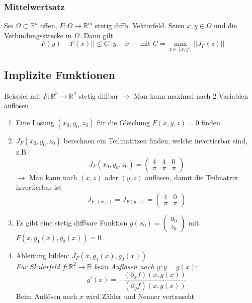 \begin{sectionbox}
    \subsubsection{Mittelwertsatz}
    Sei $\Omega \subset \mathbb R^n$ offen, $F: \Omega \rightarrow \mathbb R^m$ stetig diffb. Vektorfeld. 
    Seien $x,y \in \Omega$ und die Verbindungsstrecke in $\Omega$. Dann gilt
    \begin{equation*}
        ||F(y)-F(x)|| \le C||y-x|| \quad \text{mit } C=\max_{z \in [x,y]}{||J_F(z)||}
    \end{equation*}
\end{sectionbox}

\subsection{Implizite Funktionen}
Beispiel mit $F:\mathbb R^3 \rightarrow \mathbb R^2$ stetig diffbar $\rightarrow$ Man kann maximal nach $2$ Variablen auflösen
\begin{enumerate}
    \item Eine Lösung $(x_0,y_0,z_0)$ für die Gleichung $F(x,y,z)=0$ finden
    \item $J_F(x_0,y_0,z_0)$ berechnen ein Teilmatrizen finden, welche invertierbar sind, z.B.:
    \begin{equation*}
    J_F(x_0,y_0,z_0)=\begin{pmatrix}
        4 & 4 & 0 \\ \pi & \pi & \pi
    \end{pmatrix}
    \end{equation*}
    $\rightarrow$ Man kann nach $(x,z)$ oder $(y,z)$ auflösen, damit die Teilmatrix invertierbar ist
    \begin{equation*}
        J_{F,(x,z)}=J_{F(y,z)}=\begin{pmatrix}
            4 & 0 \\ \pi & \pi
        \end{pmatrix}
    \end{equation*}
    \item Es gibt eine stetig diffbare Funktion $g(x_0)=\begin{pmatrix}y_0 \\ z_0\end{pmatrix}$ mit $F(x,g_1(x),g_2(x))=0$
    \item Ableitung bilden: $J_F(x, g_1(x), g_2(x))$ \\
    \textit{Für Skalarfeld $f: \mathbb R^2 \rightarrow \mathbb R$ beim Auflösen nach $y: y=g(x)$}:
    \begin{equation*}
        g'(x)=-\frac{(\partial_xf)(x, g(x))}{(\partial_yf)(x, g(x))}
    \end{equation*}
    Beim Auflösen nach $x$ wird Zähler und Nenner vertauscht
\end{enumerate}
